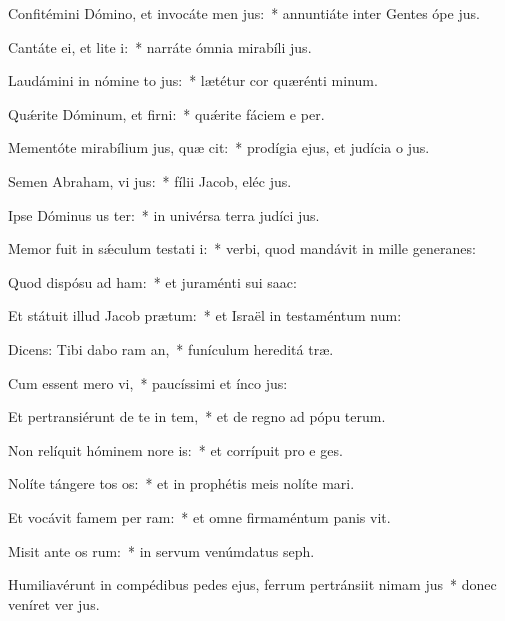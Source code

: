 \item Confitémini Dómino, et invocáte men jus:~* annuntiáte inter Gentes ópe jus.
\item Cantáte ei, et lite i:~* narráte ómnia mirabíli jus.
\item Laudámini in nómine to jus:~* lætétur cor quærénti minum.
\item Quǽrite Dóminum, et firni:~* quǽrite fáciem e per.
\item Mementóte mirabílium jus, quæ cit:~* prodígia ejus, et judícia o jus.
\item Semen Abraham, vi jus:~* fílii Jacob, eléc jus.
\item Ipse Dóminus us ter:~* in univérsa terra judíci jus.
\item Memor fuit in sǽculum testati i:~* verbi, quod mandávit in mille generanes:
\item Quod dispósu ad ham:~* et juraménti sui  saac:
\item Et státuit illud Jacob  prætum:~* et Israël in testaméntum num:
\item Dicens: Tibi dabo ram an,~* funículum hereditá træ.
\item Cum essent mero vi,~* paucíssimi et ínco jus:
\item Et pertransiérunt de te in tem,~* et de regno ad pópu terum.
\item Non relíquit hóminem nore is:~* et corrípuit pro e ges.
\item Nolíte tángere tos os:~* et in prophétis meis nolíte mari.
\item Et vocávit famem per ram:~* et omne firmaméntum panis vit.
\item Misit ante os rum:~* in servum venúmdatus  seph.
\item Humiliavérunt in compédibus pedes ejus, ferrum pertránsiit nimam jus~* donec veníret ver jus.
